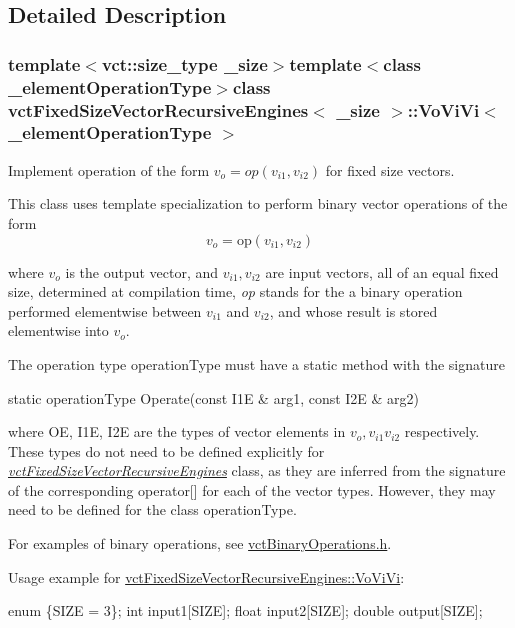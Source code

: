 \subsection{Detailed Description}
\subsubsection*{template$<$vct\+::size\+\_\+type \+\_\+size$>$template$<$class \+\_\+element\+Operation\+Type$>$class vct\+Fixed\+Size\+Vector\+Recursive\+Engines$<$ \+\_\+size $>$\+::\+Vo\+Vi\+Vi$<$ \+\_\+element\+Operation\+Type $>$}

Implement operation of the form $v_o = op(v_{i1}, v_{i2})$ for fixed size vectors. 

This class uses template specialization to perform binary vector operations of the form \[ v_o = \mathrm{op}(v_{i1}, v_{i2}) \]

where $v_o$ is the output vector, and $v_{i1}, v_{i2}$ are input vectors, all of an equal fixed size, determined at compilation time, {\itshape op} stands for the a binary operation performed elementwise between $v_{i1}$ and $v_{i2}$, and whose result is stored elementwise into $v_o$.

The operation type operation\+Type must have a static method with the signature


\begin{DoxyPre}
static operationType Operate(const I1E & arg1, const I2E & arg2)
\end{DoxyPre}


where O\+E, I1\+E, I2\+E are the types of vector elements in $v_o, v_{i1} v_{i2}$ respectively. These types do not need to be defined explicitly for {\itshape \hyperlink{classvct_fixed_size_vector_recursive_engines}{vct\+Fixed\+Size\+Vector\+Recursive\+Engines}} class, as they are inferred from the signature of the corresponding operator\mbox{[}\mbox{]} for each of the vector types. However, they may need to be defined for the class operation\+Type.

For examples of binary operations, see \hyperlink{vct_binary_operations_8h}{vct\+Binary\+Operations.\+h}.

Usage example for \hyperlink{classvct_fixed_size_vector_recursive_engines_1_1_vo_vi_vi}{vct\+Fixed\+Size\+Vector\+Recursive\+Engines\+::\+Vo\+Vi\+Vi}\+: 
\begin{DoxyPre}
enum \{SIZE = 3\};
int input1[SIZE];
float input2[SIZE];
double output[SIZE];\end{DoxyPre}



